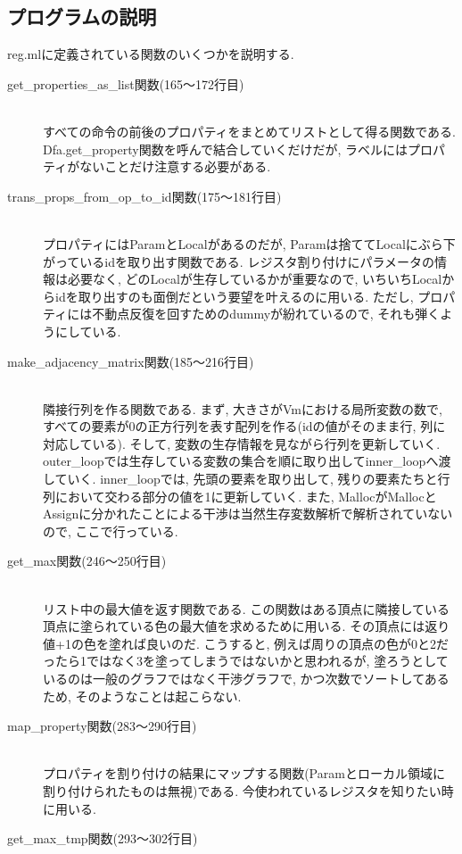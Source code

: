 \documentclass{jarticle}
\begin{document}
\subsection{プログラムの説明}
reg.mlに定義されている関数のいくつかを説明する.
\begin{description}
\item[get\_properties\_as\_list関数(165〜172行目)] \leavevmode \\
すべての命令の前後のプロパティをまとめてリストとして得る関数である. Dfa.get\_property関数を呼んで結合していくだけだが, ラベルにはプロパティがないことだけ注意する必要がある.
\item[trans\_props\_from\_op\_to\_id関数(175〜181行目)] \leavevmode \\
プロパティにはParamとLocalがあるのだが, Paramは捨ててLocalにぶら下がっているidを取り出す関数である. レジスタ割り付けにパラメータの情報は必要なく, どのLocalが生存しているかが重要なので, いちいちLocalからidを取り出すのも面倒だという要望を叶えるのに用いる. ただし, プロパティには不動点反復を回すためのdummyが紛れているので, それも弾くようにしている.
\item[make\_adjacency\_matrix関数(185〜216行目)] \leavevmode \\
隣接行列を作る関数である. まず, 大きさがVmにおける局所変数の数で, すべての要素が0の正方行列を表す配列を作る(idの値がそのまま行, 列に対応している). そして, 変数の生存情報を見ながら行列を更新していく. outer\_loopでは生存している変数の集合を順に取り出してinner\_loopへ渡していく. inner\_loopでは, 先頭の要素を取り出して, 残りの要素たちと行列において交わる部分の値を1に更新していく. また, MallocがMallocとAssignに分かれたことによる干渉は当然生存変数解析で解析されていないので, ここで行っている. 
\item[get\_max関数(246〜250行目)] \leavevmode \\
リスト中の最大値を返す関数である. この関数はある頂点に隣接している頂点に塗られている色の最大値を求めるために用いる. その頂点には返り値+1の色を塗れば良いのだ. こうすると, 例えば周りの頂点の色が0と2だったら1ではなく3を塗ってしまうではないかと思われるが, 塗ろうとしているのは一般のグラフではなく干渉グラフで, かつ次数でソートしてあるため, そのようなことは起こらない.
\item[map\_property関数(283〜290行目)] \leavevmode \\
プロパティを割り付けの結果にマップする関数(Paramとローカル領域に割り付けられたものは無視)である. 今使われているレジスタを知りたい時に用いる.
\item[get\_max\_tmp関数(293〜302行目)] \leavevmode \\

\end{description}
\end{document}
